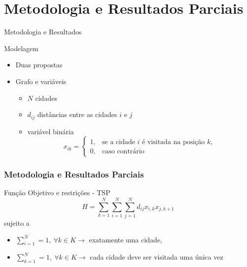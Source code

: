 \documentclass[xcolor={dvipsnames,table}]{beamer}
\begin{document}
\section{Metodologia e Resultados Parciais}
\begin{frame}{Metodologia e Resultados}
    \begin{block}{Modelagem}
        \begin{itemize}
            \item Duas propostas
            \item Grafo e variáveis
            \begin{itemize}
                \item $N$ cidades
                \item $d_{ij}$ distâncias entre as cidades $i$ e $j$
                \item variável binária
                $$x_{ik}=\begin{cases}
                    1, &\text{se a cidade }i\text{ é visitada na posição }k,\\
                    0, &\text{caso contrário}
                \end{cases}$$
            \end{itemize}
        \end{itemize}
    \end{block}
\end{frame}

\begin{frame}
    \frametitle{Metodologia e Resultados Parciais}

    \begin{block}{Função Objetivo e restrições - TSP}
        $$H=\sum_{k=1}^{N}\sum_{i=1}^{N}\sum_{j=1}^{N} d_{ij}x_{i,k}x_{j,k+1}$$
    sujeito a 
        \begin{itemize}
            \item $\displaystyle\sum_{i=1}^{N} = 1,\ \forall k\in K\rightarrow$ exatamente uma cidade, 
            \item $\displaystyle\sum_{k=1}^{N} = 1,\ \forall k\in K\rightarrow$ cada cidade deve ser visitada uma única vez
        \end{itemize}
    \end{block}

\end{frame}
\end{document}
